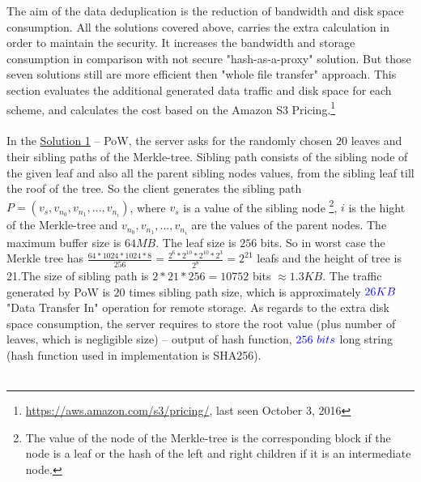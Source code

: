 \documentclass[12pt]{article}
\begin{document}
The aim of the data deduplication is the reduction of bandwidth and disk space consumption. All the solutions covered above, carries the extra calculation in order to maintain the security. It increases  the bandwidth and storage consumption in comparison with not secure "hash-as-a-proxy" solution. But those seven solutions still are more efficient then "whole file transfer" approach. This section evaluates the additional  generated data traffic and disk space for each scheme, and  calculates the cost  based on the Amazon S3 Pricing.\footnote{\url{https://aws.amazon.com/s3/pricing/}, last seen October 3, 2016}\\\\
In the \hyperref[sub:Soltuion1]{Solution 1} -- PoW, the server asks for the  randomly chosen $20$ leaves  and their sibling paths of the Merkle-tree. Sibling path consists of the sibling node of the given leaf and also all the parent sibling nodes values, from the sibling leaf till the roof of the tree. So the client generates the sibling path $P=(v_s,v_{n_0},v_{n_1},...,v_{n_i})$, where $v_s$ is a value of the sibling node \footnote{The value of the node of the Merkle-tree is the corresponding block if the node is a leaf or the hash of the left and right children if it is an intermediate node.}, $i$ is the hight of the Merkle-tree and $v_{n_0},v_{n_1},...,v_{n_i}$ are the values of the parent nodes. The maximum buffer size is $64MB$. The leaf size is $256$ bits. So in worst case the Merkle tree has $\frac{64 * 1024* 1024 * 8}{256} = \frac{2^6*2^10*2^10*2^3}{2^8}=2^{21}$ leafs and the height of tree is 21.The size of sibling path is $2*21*256=10752$ bits  $\approx 1.3 KB$. The traffic generated by PoW is $20$ times sibling path size, which is approximately $\color{blue}26KB$ "Data Transfer In" operation for remote storage. As regards to the extra disk space consumption, the server requires to store the root value (plus number of leaves, which is negligible size) -- output of hash function, $\color{blue}256\ bits$  long string (hash function used in implementation is SHA256).\\\\
\end{document}
